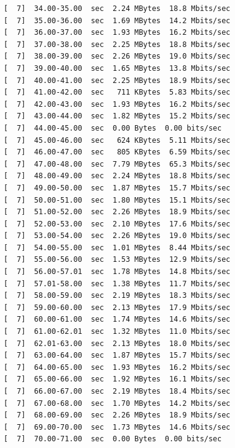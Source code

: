 \documentclass[12pt]{article}
\begin{document}
\begin{enumerate}
\begin{latin}
\begin{Verbatim}
[  7]  34.00-35.00  sec  2.24 MBytes  18.8 Mbits/sec                  
[  7]  35.00-36.00  sec  1.69 MBytes  14.2 Mbits/sec                  
[  7]  36.00-37.00  sec  1.93 MBytes  16.2 Mbits/sec                  
[  7]  37.00-38.00  sec  2.25 MBytes  18.8 Mbits/sec                  
[  7]  38.00-39.00  sec  2.26 MBytes  19.0 Mbits/sec                  
[  7]  39.00-40.00  sec  1.65 MBytes  13.8 Mbits/sec                  
[  7]  40.00-41.00  sec  2.25 MBytes  18.9 Mbits/sec                  
[  7]  41.00-42.00  sec   711 KBytes  5.83 Mbits/sec                  
[  7]  42.00-43.00  sec  1.93 MBytes  16.2 Mbits/sec                  
[  7]  43.00-44.00  sec  1.82 MBytes  15.2 Mbits/sec                  
[  7]  44.00-45.00  sec  0.00 Bytes  0.00 bits/sec                  
[  7]  45.00-46.00  sec   624 KBytes  5.11 Mbits/sec                  
[  7]  46.00-47.00  sec   805 KBytes  6.59 Mbits/sec                  
[  7]  47.00-48.00  sec  7.79 MBytes  65.3 Mbits/sec                  
[  7]  48.00-49.00  sec  2.24 MBytes  18.8 Mbits/sec                  
[  7]  49.00-50.00  sec  1.87 MBytes  15.7 Mbits/sec                  
[  7]  50.00-51.00  sec  1.80 MBytes  15.1 Mbits/sec                  
[  7]  51.00-52.00  sec  2.26 MBytes  18.9 Mbits/sec                  
[  7]  52.00-53.00  sec  2.10 MBytes  17.6 Mbits/sec                  
[  7]  53.00-54.00  sec  2.26 MBytes  19.0 Mbits/sec                  
[  7]  54.00-55.00  sec  1.01 MBytes  8.44 Mbits/sec                  
[  7]  55.00-56.00  sec  1.53 MBytes  12.9 Mbits/sec                  
[  7]  56.00-57.01  sec  1.78 MBytes  14.8 Mbits/sec                  
[  7]  57.01-58.00  sec  1.38 MBytes  11.7 Mbits/sec                  
[  7]  58.00-59.00  sec  2.19 MBytes  18.3 Mbits/sec                  
[  7]  59.00-60.00  sec  2.13 MBytes  17.9 Mbits/sec                  
[  7]  60.00-61.00  sec  1.74 MBytes  14.6 Mbits/sec                  
[  7]  61.00-62.01  sec  1.32 MBytes  11.0 Mbits/sec                  
[  7]  62.01-63.00  sec  2.13 MBytes  18.0 Mbits/sec                  
[  7]  63.00-64.00  sec  1.87 MBytes  15.7 Mbits/sec                  
[  7]  64.00-65.00  sec  1.93 MBytes  16.2 Mbits/sec                  
[  7]  65.00-66.00  sec  1.92 MBytes  16.1 Mbits/sec                  
[  7]  66.00-67.00  sec  2.19 MBytes  18.4 Mbits/sec                  
[  7]  67.00-68.00  sec  1.70 MBytes  14.2 Mbits/sec                  
[  7]  68.00-69.00  sec  2.26 MBytes  18.9 Mbits/sec                  
[  7]  69.00-70.00  sec  1.73 MBytes  14.6 Mbits/sec                  
[  7]  70.00-71.00  sec  0.00 Bytes  0.00 bits/sec                  

\end{Verbatim}
\end{latin}
\end{enumerate}
\end{document}
